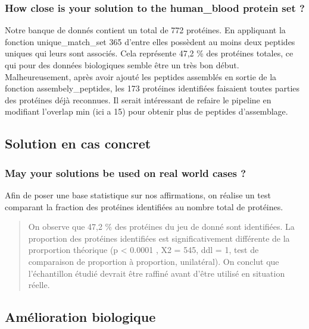 \documentclass[titlepage]{report}
\begin{document}
\subsubsection{How close is your solution to the human\_blood protein set ?}
\hspace*{1cm} Notre banque de donnés contient un total de 772 protéines. En appliquant la fonction unique\_match\_set 365 d'entre elles possèdent au moins deux peptides uniques qui leurs sont associés. Cela représente 47,2 \% des protéines totales, ce qui pour des données biologiques semble être un très bon début.\\
\hspace*{1cm} Malheureusement, après avoir ajouté les peptides assemblés en sortie de la fonction assembely\_peptides, les 173 protéines identifiées faisaient toutes parties des protéines déjà reconnues. Il serait intéressant de refaire le pipeline en modifiant l'overlap min (ici a 15) pour obtenir plus de peptides d'assemblage. 

\subsection{Solution en cas concret}
\subsubsection{May your solutions be used on real world cases ?}
\hspace*{1cm} Afin de poser une base statistique sur nos affirmations, on réalise un test comparant la fraction des protéines identifiées au nombre total de protéines. 
\begin{quote}
    On observe que 47,2 \% des protéines du jeu de donné sont identifiées. 
    La proportion des protéines identifiées est significativement différente de la prorportion théorique (p < 0.0001 , X2 = 545, ddl = 1, test de comparaison de proportion à proportion, unilatéral). On conclut que l'échantillon étudié devrait être raffiné avant d'être utilisé en situation réelle.
\end{quote}

\subsection{Amélioration biologique}
\end{document}
